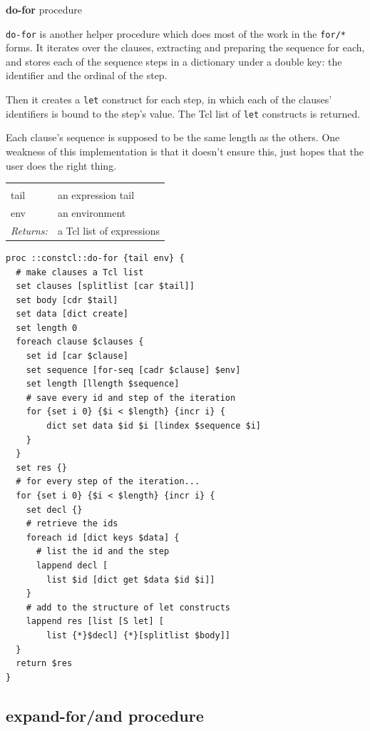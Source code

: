 \documentclass[twoside]{report}
\begin{document}
\textbf{do-for} procedure

\texttt{do-for} is another helper procedure which does most of the work in the \texttt{for/*} forms. It iterates over the clauses, extracting and preparing the sequence for each, and stores each of the sequence steps in a dictionary under a double key: the identifier and the ordinal of the step.

Then it creates a \texttt{let} construct for each step, in which each of the clauses' identifiers is bound to the step's value. The Tcl list of \texttt{let} constructs is returned.

Each clause's sequence is supposed to be the same length as the others. One weakness of this implementation is that it doesn't ensure this, just hopes that the user does the right thing.

\noindent\begin{tabular}{ |p{1.9cm} p{8cm}| }
\hline
\rowcolor[HTML]{CCCCCC} \multicolumn{2}{|l|}{\bf do-for (internal)} \\
tail & an expression tail \\
env & an environment \\
\textit{Returns:} & a Tcl list of expressions \\
\hline
\end{tabular}

\begin{lstlisting}
proc ::constcl::do-for {tail env} {
  # make clauses a Tcl list
  set clauses [splitlist [car $tail]]
  set body [cdr $tail]
  set data [dict create]
  set length 0
  foreach clause $clauses {
    set id [car $clause]
    set sequence [for-seq [cadr $clause] $env]
    set length [llength $sequence]
    # save every id and step of the iteration
    for {set i 0} {$i < $length} {incr i} {
        dict set data $id $i [lindex $sequence $i]
    }
  }
  set res {}
  # for every step of the iteration...
  for {set i 0} {$i < $length} {incr i} {
    set decl {}
    # retrieve the ids
    foreach id [dict keys $data] {
      # list the id and the step
      lappend decl [
        list $id [dict get $data $id $i]]
    }
    # add to the structure of let constructs
    lappend res [list [S let] [
        list {*}$decl] {*}[splitlist $body]]
  }
  return $res
}
\end{lstlisting}

\subsection{expand-for/and procedure}
\label{expandforand-procedure}
\end{document}
